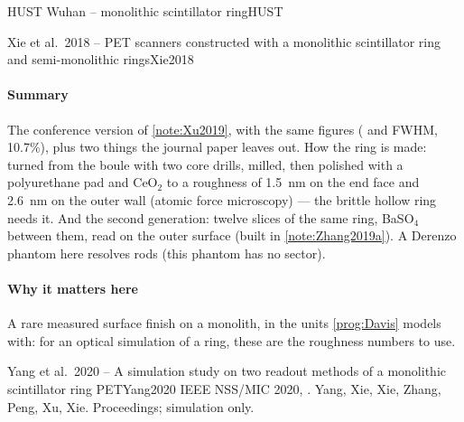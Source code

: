 \begin{programnote}{HUST Wuhan -- monolithic scintillator ring}{HUST}
\begin{papernote}{Xie et al.\ 2018 -- PET scanners constructed with a monolithic scintillator ring and semi-monolithic rings}{Xie2018}
\paragraph{Summary}
The conference version of \ref{note:Xu2019}, with the same figures (
and  FWHM, 10.7\%), plus two things the journal paper leaves out. How
the ring is made: turned from the boule with two core drills, milled, then
polished with a polyurethane pad and CeO$_2$ to a roughness of \qty{1.5}{\nm}
on the end face and \qty{2.6}{\nm} on the outer wall (atomic force
microscopy) --- the brittle hollow ring needs it. And the second generation:
twelve  slices of the same ring, BaSO$_4$ between them, read on the outer
surface (built in \ref{note:Zhang2019a}). A Derenzo phantom here resolves
 rods (this phantom has no  sector).

\paragraph{Why it matters here}
A rare measured surface finish on a monolith, in the units \ref{prog:Davis}
models with: for an optical simulation of a ring, these are the roughness
numbers to use.

\end{papernote}

\begin{papernote}{Yang et al.\ 2020 -- A simulation study on two readout methods of a monolithic scintillator ring PET}{Yang2020}
IEEE NSS/MIC 2020, . Yang, Xie, Xie,
Zhang, Peng, Xu, Xie. Proceedings; simulation only.


\end{papernote}
\end{programnote}
